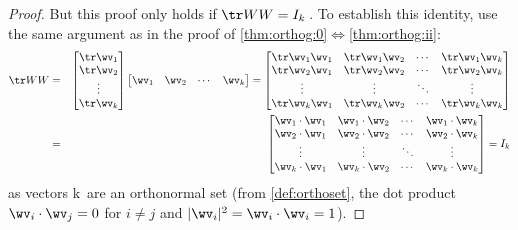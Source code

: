 \begin{proof}
But this proof only holds if \(\tr WW=I_k\)\,.
To establish this identity, use the same argument as in the proof of \cref{thm:orthog:0}$\iff$\ref{thm:orthog:ii}:
\begin{eqnarray*}
\tr WW
&=&\begin{bmatrix} \tr\wv_1\\\tr\wv_2\\\vdots\\\tr\wv_k \end{bmatrix}
\begin{bmatrix} \wv_1&\wv_2&\cdots&\wv_k \end{bmatrix}
=\begin{bmatrix} \tr\wv_1\wv_1&\tr\wv_1\wv_2&\cdots&\tr\wv_1\wv_k 
\\ \tr\wv_2\wv_1&\tr\wv_2\wv_2&\cdots&\tr\wv_2\wv_k 
\\\vdots&\vdots&\ddots&\vdots
\\ \tr\wv_k\wv_1&\tr\wv_k\wv_2&\cdots&\tr\wv_k\wv_k \end{bmatrix}
\\&=&\begin{bmatrix} \wv_1\cdot\wv_1&\wv_1\cdot\wv_2&\cdots&\wv_1\cdot\wv_k 
\\ \wv_2\cdot\wv_1&\wv_2\cdot\wv_2&\cdots&\wv_2\cdot\wv_k 
\\\vdots&\vdots&\ddots&\vdots
\\ \wv_k\cdot\wv_1&\wv_k\cdot\wv_2&\cdots&\wv_k\cdot\wv_k \end{bmatrix}
=I_k
\end{eqnarray*}
as vectors \hlist\wv k\ are an orthonormal set (from \cref{def:orthoset}, the dot product \(\wv_i\cdot\wv_j=0\) for \(i\neq j\) and \(|\wv_i|^2=\wv_i\cdot\wv_i=1\)).

\end{proof}
